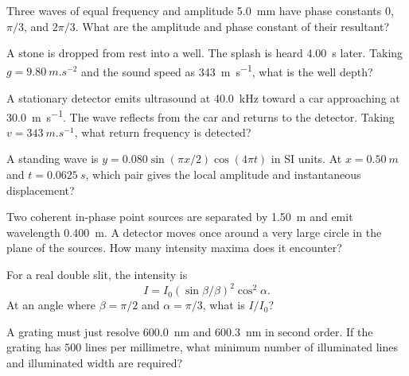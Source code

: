 \documentclass[10pt,a4paper]{physicsquiz}
\begin{document}
\begin{quizquestions}[2]
  \item Three waves of equal frequency and amplitude \SI{5.0}{mm} have phase constants \(0\), \(\pi/3\), and \(2\pi/3\). What are the amplitude and phase constant of their resultant?
  \item A stone is dropped from rest into a well. The splash is heard \SI{4.00}{s} later. Taking \(g=\SI{9.80}{m.s^{-2}}\) and the sound speed as \SI{343}{m.s^{-1}}, what is the well depth?
  \item A stationary detector emits ultrasound at \SI{40.0}{kHz} toward a car approaching at \SI{30.0}{m.s^{-1}}. The wave reflects from the car and returns to the detector. Taking \(v=\SI{343}{m.s^{-1}}\), what return frequency is detected?
  \item A standing wave is \(y=0.080\sin(\pi x/2)\cos(4\pi t)\) in SI units. At \(x=\SI{0.50}{m}\) and \(t=\SI{0.0625}{s}\), which pair gives the local amplitude and instantaneous displacement?
  \item Two coherent in-phase point sources are separated by \SI{1.50}{m} and emit wavelength \SI{0.400}{m}. A detector moves once around a very large circle in the plane of the sources. How many intensity maxima does it encounter?
  \item For a real double slit, the intensity is \[I=I_0{(\sin\beta/\beta)}^2\cos^2\alpha.\] At an angle where \(\beta=\pi/2\) and \(\alpha=\pi/3\), what is \(I/I_0\)?
  \item A grating must just resolve \SI{600.0}{nm} and \SI{600.3}{nm} in second order. If the grating has \(500\) lines per millimetre, what minimum number of illuminated lines and illuminated width are required?

\end{quizquestions}
\end{document}
